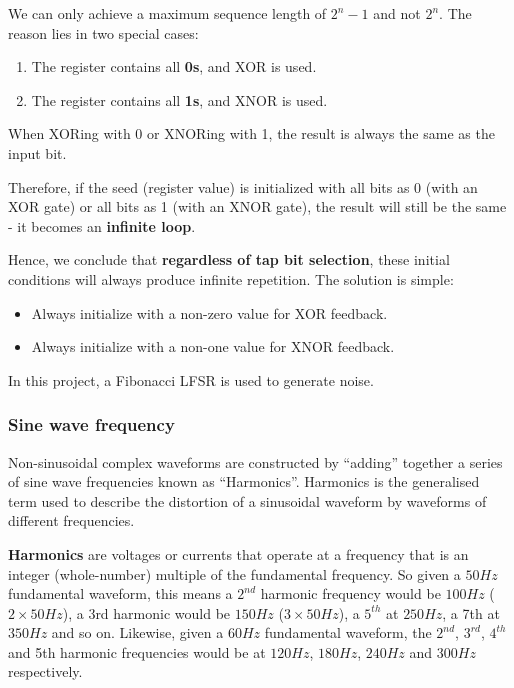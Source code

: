 We can only achieve a maximum sequence length of $2^{n} - 1$ and not $2^{n}$. The reason lies in two special cases:

\begin{enumerate}[label=\arabic*.]
	\item The register contains all \textbf{0s}, and XOR is used.
	\item The register contains all \textbf{1s}, and XNOR is used.
\end{enumerate}

When XORing with 0 or XNORing with 1, the result is always the same as the input bit.

Therefore, if the seed (register value) is initialized with all bits as 0 (with an XOR gate) or all bits as 1 (with an XNOR gate), the result will still be the same - it becomes an \textbf{infinite loop}.

Hence, we conclude that \textbf{regardless of tap bit selection}, these initial conditions will always produce infinite repetition. The solution is simple:

\begin{itemize}[label=-]
	\item Always initialize with a non-zero value for XOR feedback.
	\item Always initialize with a non-one value for XNOR feedback.
\end{itemize}

In this project, a Fibonacci LFSR is used to generate noise.

\subsubsection{Sine wave frequency}

Non-sinusoidal complex waveforms are constructed by “adding” together a series of sine wave frequencies known as “Harmonics”. Harmonics is the generalised term used to describe the distortion of a sinusoidal waveform by waveforms of different frequencies.

\textbf{Harmonics} are voltages or currents that operate at a frequency that is an integer (whole-number) multiple of the fundamental frequency. So given a $50Hz$ fundamental waveform, this means a $2^{nd}$ harmonic frequency would be $100Hz$ ($2 \times 50Hz$), a 3rd harmonic would be $150Hz$ ($3 \times 50Hz$), a $5^{th}$ at $250Hz$, a 7th at $350Hz$ and so on. Likewise, given a $60Hz$ fundamental waveform, the $2^{nd}$, $3^{rd}$, $4^{th}$ and 5th harmonic frequencies would be at $120Hz$, $180Hz$, $240Hz$ and $300Hz$ respectively.

